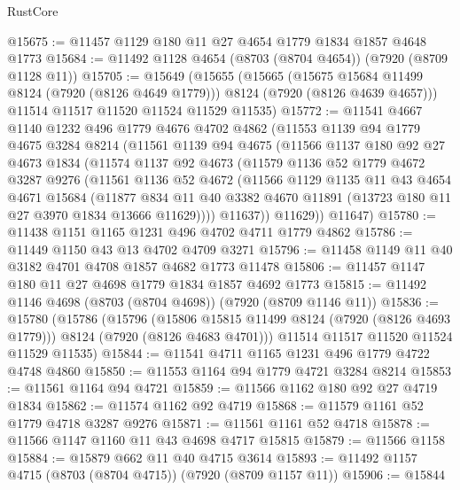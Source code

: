 \begin{lexlean}{RustCore}
\begin{coremodule}
@15675 := @11457 @1129 @180 @11 @27 @4654 @1779 @1834 @1857 @4648 @1773
@15684 := @11492 @1128 @4654 (@8703 (@8704 @4654)) (@7920 (@8709 @1128 @11))
@15705 := @15649
    (@15655
      (@15665
        (@15675 @15684 @11499 @8124 (@7920 (@8126 @4649 @1779)))
        @8124
        (@7920 (@8126 @4639 @4657)))
      @11514
      @11517
      @11520
      @11524
      @11529
      @11535)
@15772 := @11541
    @4667
    @1140
    @1232
    @496
    @1779
    @4676
    @4702
    @4862
    (@11553
      @1139
      @94
      @1779
      @4675
      @3284
      @8214
      (@11561
        @1139
        @94
        @4675
        (@11566
          @1137
          @180
          @92
          @27
          @4673
          @1834
          (@11574
            @1137
            @92
            @4673
            (@11579
              @1136
              @52
              @1779
              @4672
              @3287
              @9276
              (@11561
                @1136
                @52
                @4672
                (@11566
                  @1129
                  @1135
                  @11
                  @43
                  @4654
                  @4671
                  @15684
                  (@11877
                    @834
                    @11
                    @40
                    @3382
                    @4670
                    @11891
                    (@13723 @180 @11 @27 @3970 @1834 @13666 @11629))))
              @11637))
          @11629))
      @11647)
@15780 := @11438 @1151 @1165 @1231 @496 @4702 @4711 @1779 @4862
@15786 := @11449 @1150 @43 @13 @4702 @4709 @3271
@15796 := @11458 @1149 @11 @40 @3182 @4701 @4708 @1857 @4682 @1773 @11478
@15806 := @11457 @1147 @180 @11 @27 @4698 @1779 @1834 @1857 @4692 @1773
@15815 := @11492 @1146 @4698 (@8703 (@8704 @4698)) (@7920 (@8709 @1146 @11))
@15836 := @15780
    (@15786
      (@15796
        (@15806 @15815 @11499 @8124 (@7920 (@8126 @4693 @1779)))
        @8124
        (@7920 (@8126 @4683 @4701)))
      @11514
      @11517
      @11520
      @11524
      @11529
      @11535)
@15844 := @11541 @4711 @1165 @1231 @496 @1779 @4722 @4748 @4860
@15850 := @11553 @1164 @94 @1779 @4721 @3284 @8214
@15853 := @11561 @1164 @94 @4721
@15859 := @11566 @1162 @180 @92 @27 @4719 @1834
@15862 := @11574 @1162 @92 @4719
@15868 := @11579 @1161 @52 @1779 @4718 @3287 @9276
@15871 := @11561 @1161 @52 @4718
@15878 := @11566 @1147 @1160 @11 @43 @4698 @4717 @15815
@15879 := @11566 @1158
@15884 := @15879 @662 @11 @40 @4715 @3614
@15893 := @11492 @1157 @4715 (@8703 (@8704 @4715)) (@7920 (@8709 @1157 @11))
@15906 := @15844

\end{coremodule}
\end{lexlean}
